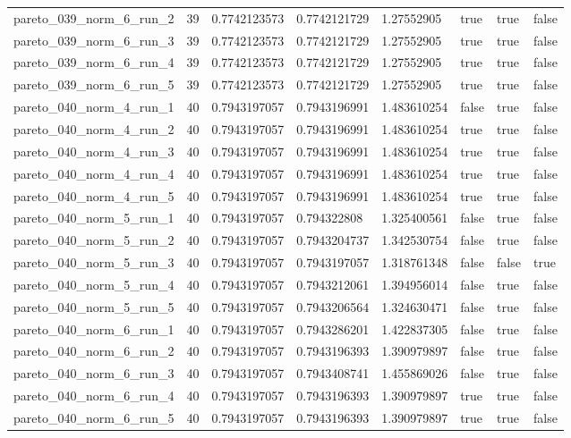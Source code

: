\begin{tabular}{@{}llllllll@{}}
pareto\_039\_norm\_6\_run\_2 & 39 & 0.7742123573 & 0.7742121729 & 1.27552905 & true & true & false \\
pareto\_039\_norm\_6\_run\_3 & 39 & 0.7742123573 & 0.7742121729 & 1.27552905 & true & true & false \\
pareto\_039\_norm\_6\_run\_4 & 39 & 0.7742123573 & 0.7742121729 & 1.27552905 & true & true & false \\
pareto\_039\_norm\_6\_run\_5 & 39 & 0.7742123573 & 0.7742121729 & 1.27552905 & true & true & false \\
pareto\_040\_norm\_4\_run\_1 & 40 & 0.7943197057 & 0.7943196991 & 1.483610254 & false & true & false \\
pareto\_040\_norm\_4\_run\_2 & 40 & 0.7943197057 & 0.7943196991 & 1.483610254 & true & true & false \\
pareto\_040\_norm\_4\_run\_3 & 40 & 0.7943197057 & 0.7943196991 & 1.483610254 & true & true & false \\
pareto\_040\_norm\_4\_run\_4 & 40 & 0.7943197057 & 0.7943196991 & 1.483610254 & true & true & false \\
pareto\_040\_norm\_4\_run\_5 & 40 & 0.7943197057 & 0.7943196991 & 1.483610254 & true & true & false \\
pareto\_040\_norm\_5\_run\_1 & 40 & 0.7943197057 & 0.794322808 & 1.325400561 & false & true & false \\
pareto\_040\_norm\_5\_run\_2 & 40 & 0.7943197057 & 0.7943204737 & 1.342530754 & false & true & false \\
pareto\_040\_norm\_5\_run\_3 & 40 & 0.7943197057 & 0.7943197057 & 1.318761348 & false & false & true \\
pareto\_040\_norm\_5\_run\_4 & 40 & 0.7943197057 & 0.7943212061 & 1.394956014 & false & true & false \\
pareto\_040\_norm\_5\_run\_5 & 40 & 0.7943197057 & 0.7943206564 & 1.324630471 & false & true & false \\
pareto\_040\_norm\_6\_run\_1 & 40 & 0.7943197057 & 0.7943286201 & 1.422837305 & false & true & false \\
pareto\_040\_norm\_6\_run\_2 & 40 & 0.7943197057 & 0.7943196393 & 1.390979897 & false & true & false \\
pareto\_040\_norm\_6\_run\_3 & 40 & 0.7943197057 & 0.7943408741 & 1.455869026 & false & true & false \\
pareto\_040\_norm\_6\_run\_4 & 40 & 0.7943197057 & 0.7943196393 & 1.390979897 & true & true & false \\
pareto\_040\_norm\_6\_run\_5 & 40 & 0.7943197057 & 0.7943196393 & 1.390979897 & true & true & false \\

\end{tabular}
